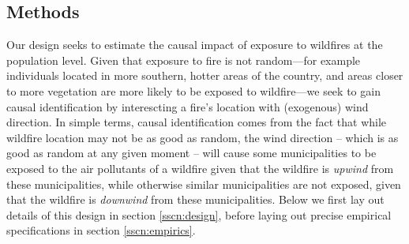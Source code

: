 \documentclass[11pt]{article}
\begin{document}
\begin{spacing}{1.5}



\section{Methods}
\label{scn:methods}
Our design seeks to estimate the causal impact of exposure to wildfires at the population level.  Given that exposure to fire is not random---for example individuals located in more southern, hotter areas of the country, and areas closer to more vegetation are more likely to be exposed to wildfire---we seek to gain causal identification by interescting a fire's location with (exogenous) wind direction.  In simple terms, causal identification comes from the fact that while wildfire location may not be as good as random, the wind direction -- which is as good as random at any given moment -- will cause some municipalities to be exposed to the air pollutants of a wildfire given that the wildfire is \emph{upwind} from these municipalities, while otherwise similar municipalities are not exposed, given that the wildfire is \emph{downwind} from these municipalities.  Below we first lay out details of this design in section \ref{sscn:design}, before laying out precise empirical specifications in section \ref{sscn:empirics}.


\end{spacing}
\end{document}
